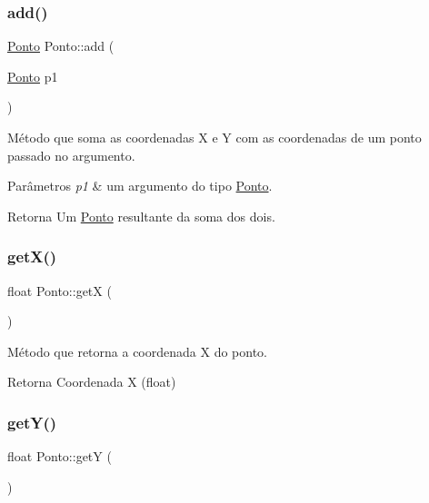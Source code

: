 \subsubsection{\texorpdfstring{add()}{add()}}
{\footnotesize\ttfamily \mbox{\hyperlink{classPonto}{Ponto}} Ponto\+::add (\begin{DoxyParamCaption}\item[{\mbox{\hyperlink{classPonto}{Ponto}}}]{p1 }\end{DoxyParamCaption})\hspace{0.3cm}{\ttfamily [inline]}}



Método que soma as coordenadas X e Y com as coordenadas de um ponto passado no argumento. 


\begin{DoxyParams}{Parâmetros}
{\em p1} & um argumento do tipo \mbox{\hyperlink{classPonto}{Ponto}}. \\
\hline
\end{DoxyParams}
\begin{DoxyReturn}{Retorna}
Um \mbox{\hyperlink{classPonto}{Ponto}} resultante da soma dos dois. 
\end{DoxyReturn}
\mbox{\label{classPonto_ae4823d6ee26ff3448ee403d26a3c6d2f}} 
\subsubsection{\texorpdfstring{get\+X()}{getX()}}
{\footnotesize\ttfamily float Ponto\+::getX (\begin{DoxyParamCaption}{ }\end{DoxyParamCaption})\hspace{0.3cm}{\ttfamily [inline]}}



Método que retorna a coordenada X do ponto. 

\begin{DoxyReturn}{Retorna}
Coordenada X (float) 
\end{DoxyReturn}
\mbox{\label{classPonto_ab120600953e6544301223b9b05a43ee5}} 
\subsubsection{\texorpdfstring{get\+Y()}{getY()}}
{\footnotesize\ttfamily float Ponto\+::getY (\begin{DoxyParamCaption}{ }\end{DoxyParamCaption})\hspace{0.3cm}{\ttfamily [inline]}}



